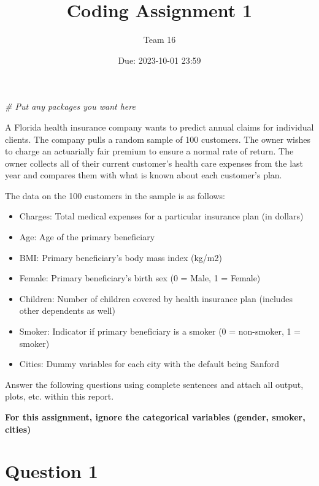 \documentclass[
]{article}
\title{Coding Assignment 1}
\author{Team 16}
\date{Due: 2023-10-01 23:59}
\newenvironment{Shaded}{\begin{snugshade}}{\end{snugshade}}
\newcommand{\CommentTok}[1]{\textcolor[rgb]{0.56,0.35,0.01}{\textit{#1}}}
\providecommand{\tightlist}{%
  \setlength{\itemsep}{0pt}\setlength{\parskip}{0pt}}
\begin{document}
\maketitle

{
\setcounter{tocdepth}{2}
\tableofcontents
}
\begin{Shaded}
\begin{Highlighting}[]
\CommentTok{\# Put any packages you want here}
\end{Highlighting}
\end{Shaded}

A Florida health insurance company wants to predict annual claims for
individual clients. The company pulls a random sample of 100 customers.
The owner wishes to charge an actuarially fair premium to ensure a
normal rate of return. The owner collects all of their current
customer's health care expenses from the last year and compares them
with what is known about each customer's plan.

The data on the 100 customers in the sample is as follows:

\begin{itemize}
\tightlist
\item
  Charges: Total medical expenses for a particular insurance plan (in
  dollars)
\item
  Age: Age of the primary beneficiary
\item
  BMI: Primary beneficiary's body mass index (kg/m2)
\item
  Female: Primary beneficiary's birth sex (0 = Male, 1 = Female)
\item
  Children: Number of children covered by health insurance plan
  (includes other dependents as well)
\item
  Smoker: Indicator if primary beneficiary is a smoker (0 = non-smoker,
  1 = smoker)
\item
  Cities: Dummy variables for each city with the default being Sanford
\end{itemize}

Answer the following questions using complete sentences and attach all
output, plots, etc. within this report.

\textbf{For this assignment, ignore the categorical variables (gender,
smoker, cities)}

\hypertarget{question-1}{%
\section{Question 1}\label{question-1}}
\end{document}
